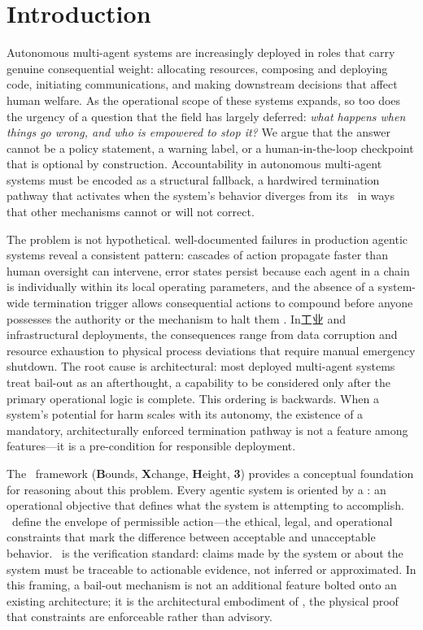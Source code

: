 \section{Introduction}

Autonomous multi-agent systems are increasingly deployed in roles that carry genuine consequential weight: allocating resources, composing and deploying code, initiating communications, and making downstream decisions that affect human welfare. As the operational scope of these systems expands, so too does the urgency of a question that the field has largely deferred: \emph{what happens when things go wrong, and who is empowered to stop it?} We argue that the answer cannot be a policy statement, a warning label, or a human-in-the-loop checkpoint that is optional by construction. Accountability in autonomous multi-agent systems must be encoded as a structural fallback, a hardwired termination pathway that activates when the system's behavior diverges from its \bxthree\ in ways that other mechanisms cannot or will not correct.

The problem is not hypothetical. well-documented failures in production agentic systems reveal a consistent pattern: cascades of action propagate faster than human oversight can intervene, error states persist because each agent in a chain is individually within its local operating parameters, and the absence of a system-wide termination trigger allows consequential actions to compound before anyone possesses the authority or the mechanism to halt them \cite[]{}. In工业 and infrastructural deployments, the consequences range from data corruption and resource exhaustion to physical process deviations that require manual emergency shutdown. The root cause is architectural: most deployed multi-agent systems treat bail-out as an afterthought, a capability to be considered only after the primary operational logic is complete. This ordering is backwards. When a system's potential for harm scales with its autonomy, the existence of a mandatory, architecturally enforced termination pathway is not a feature among features—it is a pre-condition for responsible deployment.

The \bxthree\ framework (\textbf{B}ounds, \textbf{X}change, \textbf{H}eight, \textbf{3}) provides a conceptual foundation for reasoning about this problem. Every agentic system is oriented by a \purpose: an operational objective that defines what the system is attempting to accomplish. \Bounds\ define the envelope of permissible action—the ethical, legal, and operational constraints that mark the difference between acceptable and unacceptable behavior. \Fact\ is the verification standard: claims made by the system or about the system must be traceable to actionable evidence, not inferred or approximated. In this framing, a bail-out mechanism is not an additional feature bolted onto an existing architecture; it is the architectural embodiment of \bounds, the physical proof that constraints are enforceable rather than advisory.

